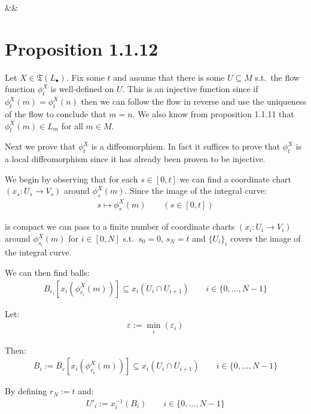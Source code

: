 		\begin{flalign*}&&\square\end{flalign*}

	\section{Proposition 1.1.12}
		Let $X \in \mathfrak{T}(L_\bullet)$. Fix some $t$ and assume that there is some $U \subseteq M$ s.t.\ the flow function $\phi_t^X$ is well-defined on $U$. This is an injective function since if $\phi_t^X(m) = \phi_t^X(n)$ then we can follow the flow in reverse and use the uniqueness of the flow to conclude that $m = n$. We also know from proposition 1.1.11 that $\phi_t^X(m) \in L_m$ for all $m \in M$. \bigskip

		Next we prove that $\phi_t^X$ is a diffeomorphism. In fact it suffices to prove that $\phi_t^X$ is a local diffeomorphism since it has already been proven to be injective. \bigskip

		We begin by observing that for each $s \in [0, t]$ we can find a coordinate chart $(x_s : U_s \to V_s)$ around $\phi_s^X(m)$. Since the image of the integral curve:
		\begin{align*}
			s \mapsto \phi_s^X(m) \qquad (s \in [0, t])
		\end{align*}

		is compact we can pass to a finite number of coordinate charts $(x_i : U_i \to V_i)$ around $\phi_{s_i}^X(m)$ for $i \in [0, N]$ s.t.\ $s_0 = 0$, $s_N = t$ and $\{U_i\}_i$ covers the image of the integral curve. \bigskip

		We can then find balls:
		\begin{align*}
			B_{\varepsilon_i}[x_i(\phi_{r_i}^X(m))] \subseteq x_i(U_i \cap U_{i + 1}) \qquad i \in \{0, \ldots, N - 1\}
		\end{align*}

		Let:
		\begin{align*}
			\varepsilon := \min_i(\varepsilon_i)
		\end{align*}

		Then:
		\begin{align*}
			B_i := B_\varepsilon[x_i(\phi_{r_i}^X(m))] \subseteq x_i(U_i \cap U_{i + 1}) \qquad i \in \{0, \ldots, N - 1\}
		\end{align*}

		By defining $r_N := t$ and:
		\begin{align*}
			U'_i := x_i^{-1}(B_i) \qquad i \in \{0, \ldots, N - 1\}
		\end{align*}

